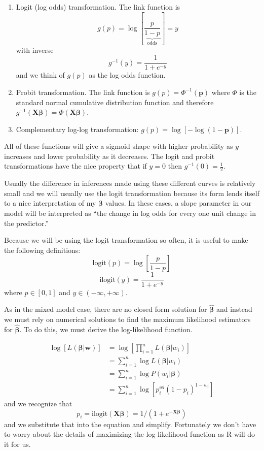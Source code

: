 \documentclass[]{book}
\theoremstyle{definition}
\theoremstyle{definition}
\theoremstyle{remark}
\begin{document}
\begin{enumerate}
\def\labelenumi{\arabic{enumi}.}
\item
  Logit (log odds) transformation. The link function is
  \[g\left(p\right)=\log\left[\underset{\textrm{odds}}{\underbrace{\frac{p}{1-p}}}\right]=y\]
  with inverse \[g^{-1}\left(y\right)=\frac{1}{1+e^{-y}}\] and we think
  of \(g\left(p\right)\) as the log odds function.
\item
  Probit transformation. The link function is
  \(g\left(p\right)=\Phi^{-1}\left(\boldsymbol{p}\right)\) where
  \(\Phi\) is the standard normal cumulative distribution function and
  therefore
  \(g^{-1}\left(\boldsymbol{X}\boldsymbol{\beta}\right)=\Phi\left(\boldsymbol{X}\boldsymbol{\beta}\right)\).
\item
  Complementary log-log transformation:
  \(g\left(p\right)=\log\left[-\log(1-\boldsymbol{p})\right]\).
\end{enumerate}

All of these functions will give a sigmoid shape with higher probability
as \(y\) increases and lower probability as it decreases. The logit and
probit transformations have the nice property that if \(y=0\) then
\(g^{-1}\left(0\right)=\frac{1}{2}\).

Usually the difference in inferences made using these different curves
is relatively small and we will usually use the logit transformation
because its form lends itself to a nice interpretation of my
\(\boldsymbol{\beta}\) values. In these cases, a slope parameter in our
model will be interpreted as ``the change in log odds for every one unit
change in the predictor.''

Because we will be using the logit transformation so often, it is useful
to make the following definitions:
\[\textrm{logit}\left(p\right)  =   \log\left[\frac{p}{1-p}\right]\]
\[\textrm{ilogit}\left(y\right) =   \frac{1}{1+e^{-y}}\] where
\(p\in\left[0,1\right]\) and \(y\in\left(-\infty,+\infty\right)\).

As in the mixed model case, there are no closed form solution for
\(\hat{\boldsymbol{\beta}}\) and instead we must rely on numerical
solutions to find the maximum likelihood estimators for
\(\hat{\boldsymbol{\beta}}\). To do this, we must derive the
log-likelihood function.

\[\begin{aligned}
 \log\left[L\left(\boldsymbol{\beta}|\boldsymbol{w}\right)\right]   &=  \log\left[\prod_{i=1}^{n}L\left(\boldsymbol{\beta}|w_{i}\right)\right] \\
    &=  \sum_{i=1}^{n}\log L\left(\boldsymbol{\beta}|w_{i}\right) \\
    &=  \sum_{i=1}^{n}\log P\left(w_{i}|\boldsymbol{\beta}\right) \\
    &=  \sum_{i=1}^{n}\log\left[p_{i}^{wi}\left(1-p_{i}\right)^{1-w_{i}}\right]
    \end{aligned}\] and we recognize that
\[p_{i}=\textrm{ilogit}\left(\boldsymbol{X\beta}\right)=1/\left(1+e^{-\boldsymbol{X\beta}}\right)\]
and we substitute that into the equation and simplify. Fortunately we
don't have to worry about the details of maximizing the log-likelihood
function as R will do it for us.
\end{document}
